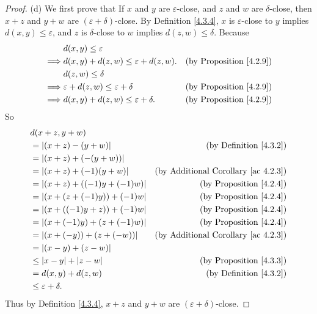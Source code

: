 \begin{proof}{(d)}
We first prove that If \(x\) and \(y\) are \(\varepsilon\)-close, and \(z\) and \(w\) are \(\delta\)-close, then \(x + z\) and \(y + w\) are \((\varepsilon + \delta)\)-close.
By Definition \ref{4.3.4}, \(x\) is \(\varepsilon\)-close to \(y\) implies \(d(x, y) \leq \varepsilon\), and \(z\) is \(\delta\)-close to \(w\) implies \(d(z, w) \leq \delta\).
Because
\begin{align*}
& d(x, y) \leq \varepsilon \\
\implies & d(x, y) + d(z, w) \leq \varepsilon + d(z, w). & \text{(by Proposition \ref{4.2.9})} \\
& d(z, w) \leq \delta \\
\implies & \varepsilon + d(z, w) \leq \varepsilon + \delta & \text{(by Proposition \ref{4.2.9})} \\
\implies & d(x, y) + d(z, w) \leq \varepsilon + \delta. & \text{(by Proposition \ref{4.2.9})} \\
\end{align*}
So
\begin{align*}
& d(x + z, y + w) \\
&= |(x + z) - (y + w)| & \text{(by Definition \ref{4.3.2})} \\
&= |(x + z) + (-(y + w))| \\
&= |(x + z) + (-1)(y + w)| & \text{(by Additional Corollary \ref{ac 4.2.3})} \\
&= |(x + z) + ((-1)y + (-1)w)| & \text{(by Proposition \ref{4.2.4})} \\
&= |(x + (z + (-1)y)) + (-1)w| & \text{(by Proposition \ref{4.2.4})} \\
&= |(x + ((-1)y + z)) + (-1)w| & \text{(by Proposition \ref{4.2.4})} \\
&= |(x + (-1)y) + (z + (-1)w)| & \text{(by Proposition \ref{4.2.4})} \\
&= |(x + (-y)) + (z + (-w))| & \text{(by Additional Corollary \ref{ac 4.2.3})} \\
&= |(x - y) + (z - w)| \\
&\leq |x - y| + |z - w| & \text{(by Proposition \ref{4.3.3})} \\
&= d(x, y) + d(z, w) & \text{(by Definition \ref{4.3.2})} \\
&\leq \varepsilon + \delta. \\
\end{align*}
Thus by Definition \ref{4.3.4}, \(x + z\) and \(y + w\) are \((\varepsilon + \delta)\)-close.


\end{proof}
